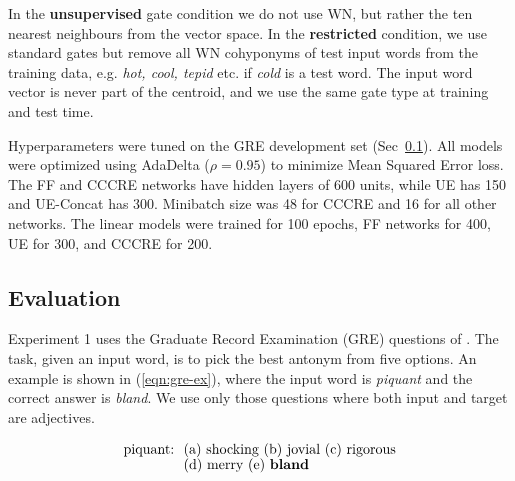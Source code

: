 \documentclass[11pt]{article}
\begin{document}
In the {\bf unsupervised} gate condition we do not use WN, but rather the ten nearest neighbours from the 
vector space. 
In the {\bf restricted} condition, we use standard gates but remove all WN cohyponyms of test input words from the training data, e.g. {\it hot, cool, tepid} etc. if {\it cold} is a test word.
The input word vector is never part of the centroid, and we use the same gate type at training and test time.

Hyperparameters were tuned on the GRE development set (Sec~\ref{sec:eval}). All models were optimized using AdaDelta ($\rho = 0.95$) to minimize Mean Squared Error loss. The FF and CCCRE networks have hidden layers of 600 units, while UE has 150 and UE-Concat has 300. Minibatch size was 48 for CCCRE and 16 for all other networks. The linear models were trained for 100 epochs, FF networks for 400, UE for 300, and CCCRE for 200.

\subsection{Evaluation}
\label{sec:eval}

Experiment 1 uses the Graduate Record Examination (GRE) questions of \citet{mohammad:13}. The task, given an input word, is to pick the best antonym from five options. An example 
is shown in (\ref{eqn:gre-ex}), where the input word is {\it piquant} and the correct answer is {\it bland}. We use only those questions 
where both input and target are adjectives.

\vspace{-6.25mm}
\begin{equation}
\begin{split}
\textrm{piquant:\ \ } & \textrm{(a) shocking (b) jovial (c) rigorous} \\[-1.5mm]
& \textrm{(d) merry (e) {\bf bland}}
\label{eqn:gre-ex}
\end{split}
\end{equation}
\vspace{-6.5 mm}
\end{document}
